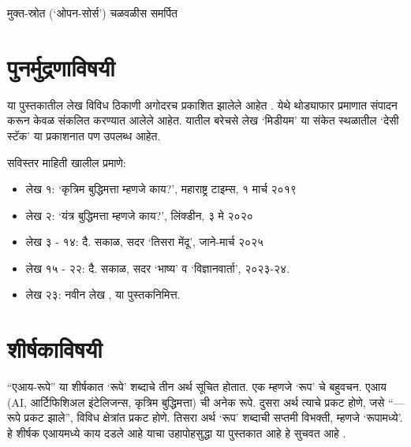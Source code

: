 \begin{dedication}
मुक्त-स्रोत (`ओपन-सोर्स') चळवळीस  समर्पित  
\end{dedication}

\clearpage

\chapter*{पुनर्मुद्रणाविषयी}

या पुस्तकातील लेख विविध ठिकाणी अगोदरच प्रकाशित झालेले आहेत .  येथे थोड्याफार प्रमाणात संपादन करून केवळ संकलित करण्यात आलेले आहेत.  यातील बरेचसे लेख `मिडीयम'  या संकेत स्थळातील `देसी स्टॅक' या प्रकाशनात पण उपलब्ध आहेत. 

\vspace{1.5em}
सविस्तर माहिती खालील प्रमाणे:

\begin{itemize}
	\item लेख १: `कृत्रिम बुद्धिमत्ता म्हणजे काय?', महाराष्ट्र टाइम्स, १  मार्च २०१९
	\item  लेख २:  `यंत्र बुद्धिमत्ता म्हणजे काय?',  लिंक्डीन, ३ मे २०२०  
	\item  लेख ३ - १४: दै. सकाळ,  सदर `तिसरा मेंदू', जाने-मार्च २०२५
	\item  लेख १५ - २२: दै. सकाळ, सदर `भाष्य' व `विज्ञानवार्ता', २०२३-२४. 
	\item  लेख २३:   नवीन लेख ,  या पुस्तकनिमित्त. 
\end{itemize}


\chapter*{शीर्षकाविषयी }
``एआय-रूपे'' या शीर्षकात `रूपे' शब्दाचे तीन अर्थ सूचित होतात. एक म्हणजे `रूप' चे बहुवचन. एआय (AI, आर्टिफिशिअल इंटेलिजन्स, कृत्रिम बुद्धिमत्ता) ची अनेक रूपे. दुसरा अर्थ त्याचे प्रकट होणे, जसे ``--- रूपे प्रकट झाले'',  विविध क्षेत्रांत प्रकट होणे. तिसरा अर्थ `रूप'  शब्दाची सप्तमी विभक्ती, म्हणजे `रूपामध्ये'.  हे शीर्षक एआयमध्ये काय दडले आहे याचा उहापोहसुद्धा या पुस्तकात आहे हे सुचवत आहे .  